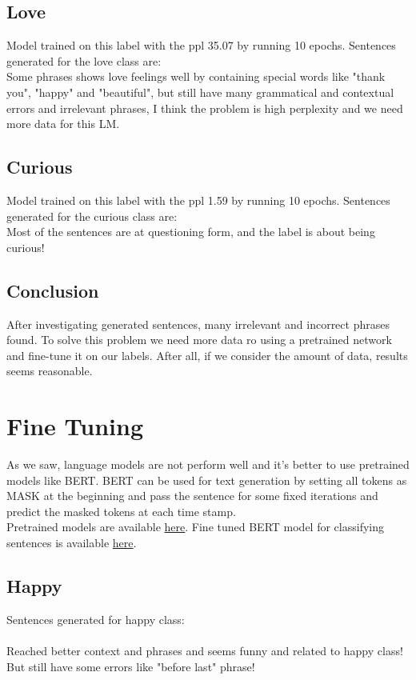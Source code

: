 \documentclass[a4paper]{article}
\begin{document}
\subsection{Love}
Model trained on this label with the ppl 35.07 by running 10 epochs. Sentences generated for the love class are:\\

Some phrases shows love feelings well by containing special words like "thank you", "happy" and "beautiful", but still have many grammatical and contextual errors and irrelevant phrases, I think the problem is high perplexity and we need more data for this LM.\\
\subsection{Curious}
Model trained on this label with the ppl 1.59 by running 10 epochs. Sentences generated for the curious class are:\\

Most of the sentences are at questioning form, and the label is about being curious!\\
\subsection{Conclusion}
After investigating generated sentences, many irrelevant and incorrect phrases found. To solve this problem we need more data ro using a pretrained network and fine-tune it on our labels. After all, if we consider the amount of data, results seems reasonable.\pagebreak
\section{Fine Tuning}
As we saw, language models are not perform well and it's better to use pretrained models like BERT. BERT can be used for text generation by setting all tokens as MASK at the beginning and pass the sentence for some fixed iterations and predict the masked tokens at each time stamp.\cite{wang2019bert}\\
Pretrained models are available \href{https://archive.org/download/NLP_BERT_MODELS}{here}.
Fine tuned BERT model for classifying sentences is available \href{https://archive.org/download/HADISHEIKHI.NLP.BERT_CLASSIFIER}{here}.
\subsection{Happy}
Sentences generated for happy class:\\
\\
Reached better context and phrases and seems funny and related to happy class! But still have some errors like "before last" phrase!
\end{document}
